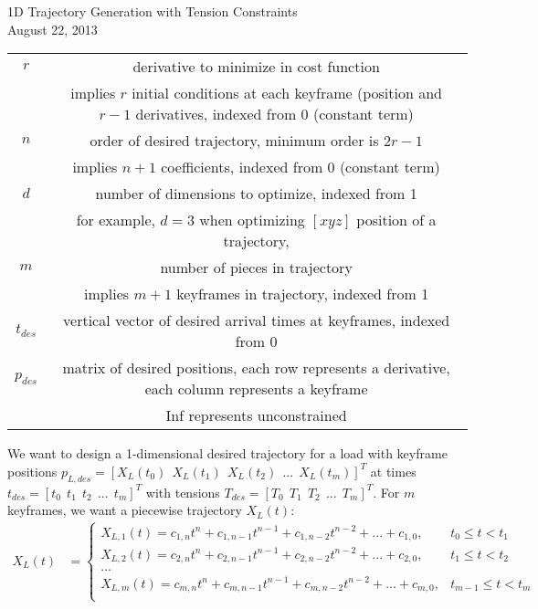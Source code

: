 \documentclass[11pt]{article}
\begin{document}
\centering
1D Trajectory Generation with Tension Constraints \\
August 22, 2013

\raggedright

\begin{table} [h!]
\footnotesize
\begin{tabular}{ c c }
	$r$ & derivative to minimize in cost function \\
		& implies $r$ initial conditions at each keyframe (position and $r-1$ derivatives, indexed from 0 (constant term) \\
	$n$ & order of desired trajectory, minimum order is $2r-1$ \\
		&  implies $n+1$ coefficients, indexed from 0 (constant term) \\
	$d$ & number of dimensions to optimize, indexed from 1 \\
	 	& for example, $d=3$ when optimizing $[x y z]$ position of a trajectory,  \\
	$m$ & number of pieces in trajectory \\
		& implies $m+1$ keyframes in trajectory, indexed from 1 \\
	$t_{des}$ & vertical vector of desired arrival times at keyframes, indexed from 0 \\
	$p_{des}$ & matrix of desired positions, each row represents a derivative, each column represents a keyframe \\
		&  Inf represents unconstrained 
\end{tabular}
\label{tab: vars}
\end{table}







\newpage
\small


We want to design a 1-dimensional desired trajectory for a load with keyframe positions $p_{L, des} = [X_L(t_0) \ \ X_L(t_1) \ \ X_L(t_2) \ \ ... \ \ X_L(t_m)]^T$ at times $t_{des} = [t_0 \ \ t_1 \ \ t_2 \ \ ... \ \ t_m]^T$ with tensions $T_{des} = [T_0 \ \ T_1 \ \ T_2 \ \ ... \ \ T_m]^T$. For $m$ keyframes, we want a piecewise trajectory $X_L(t)$:
\begin{align*}
X_L(t) &= 
\begin{cases}
    X_{L,1} (t) = c_{1, n} t^n + c_{1, n-1} t^{n-1} + c_{1, n-2} t^{n-2} + ... + c_{1, 0}, & t_0 \le t < t_1 \\
    X_{L,2} (t) = c_{2, n} t^n + c_{2, n-1} t^{n-1} + c_{2, n-2} t^{n-2} + ... + c_{2, 0}, & t_1 \le t < t_2 \\
    ... \\
    X_{L,m} (t) = c_{m, n} t^n + c_{m, n-1} t^{n-1} + c_{m, n-2} t^{n-2} + ... + c_{m, 0}, & t_{m-1} \le t < t_m \\
\end{cases}
\end{align*}
\end{document}
